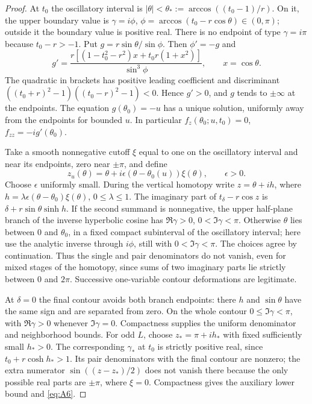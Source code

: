 \documentclass[11pt,a4paper]{article}
\numberwithin{equation}{section}
\theoremstyle{plain}
\theoremstyle{definition}
\begin{document}
\begin{proof}
At $t_0$ the oscillatory interval is $|\theta|<\theta_*:=\arccos((t_0-1)/r)$. On it, the upper boundary value is $\gamma=i\phi$, $\phi=\arccos(t_0-r\cos\theta)\in(0,\pi)$; outside it the boundary value is positive real. There is no endpoint of type $\gamma=i\pi$ because $t_0-r>-1$. Put $g=r\sin\theta/\sin\phi$. Then $\phi'=-g$ and
\begin{equation}
g'=\frac{r[(1-t_0^2-r^2)x+t_0r(1+x^2)]}{\sin^3\phi},\qquad x=\cos\theta.\label{eq:A13}
\end{equation}
The quadratic in brackets has positive leading coefficient and discriminant $((t_0+r)^2-1)((t_0-r)^2-1)<0$. Hence $g'>0$, and $g$ tends to $\pm\infty$ at the endpoints. The equation $g(\theta_0)=-u$ has a unique solution, uniformly away from the endpoints for bounded $u$. In particular $f_z(\theta_0;u,t_0)=0$, $f_{zz}=-ig'(\theta_0)$.

Take a smooth nonnegative cutoff $\xi$ equal to one on the oscillatory interval and near its endpoints, zero near $\pm\pi$, and define
\[
z_u(\theta)=\theta+i\epsilon(\theta-\theta_0(u))\xi(\theta),\qquad \epsilon>0.
\]
Choose $\epsilon$ uniformly small. During the vertical homotopy write $z=\theta+i h$, where $h=\lambda\epsilon(\theta-\theta_0)\xi(\theta)$, $0\le\lambda\le1$. The imaginary part of $t_\delta-r\cos z$ is $\delta+r\sin\theta\sinh h$. If the second summand is nonnegative, the upper half-plane branch of the inverse hyperbolic cosine has $\Re\gamma>0$, $0<\Im\gamma<\pi$. Otherwise $\theta$ lies between $0$ and $\theta_0$, in a fixed compact subinterval of the oscillatory interval; here use the analytic inverse through $i\phi$, still with $0<\Im\gamma<\pi$. The choices agree by continuation. Thus the single and pair denominators do not vanish, even for mixed stages of the homotopy, since sums of two imaginary parts lie strictly between $0$ and $2\pi$. Successive one-variable contour deformations are legitimate.

At $\delta=0$ the final contour avoids both branch endpoints: there $h$ and $\sin\theta$ have the same sign and are separated from zero. On the whole contour $0\le\Im\gamma<\pi$, with $\Re\gamma>0$ whenever $\Im\gamma=0$. Compactness supplies the uniform denominator and neighborhood bounds. For odd $L$, choose $z_*=\pi+ih_*$ with fixed sufficiently small $h_*>0$. The corresponding $\gamma_*$ at $t_0$ is strictly positive real, since $t_0+r\cosh h_*>1$. Its pair denominators with the final contour are nonzero; the extra numerator $\sin((z-z_*)/2)$ does not vanish there because the only possible real parts are $\pm\pi$, where $\xi=0$. Compactness gives the auxiliary lower bound and \eqref{eq:A6}.


\end{proof}
\end{document}
